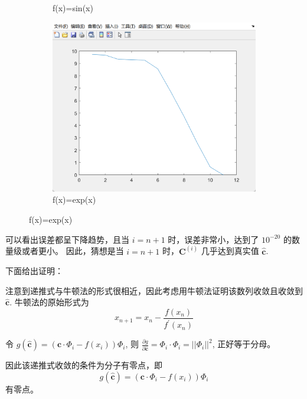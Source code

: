 \documentclass[11pt]{ctexart}
\begin{document}
\begin{figure}[H]
\begin{subfigure}[t]{0.3\textwidth}
            \caption{f(x)=sin(x)}
            \label{fig:b}
        \end{subfigure}
        \begin{subfigure}[t]{0.3\textwidth}
            \centering
            \includegraphics[width=\textwidth]{./picture/exp1_3_3}
            \caption{f(x)=exp(x)}
        \end{subfigure}
    \end{figure}

    可以看出误差都呈下降趋势，且当 \(i=n+1\) 时，误差非常小，达到了 \(10^{-20}\) 的数量级或者更小。
    因此，猜想是当 \(i=n+1\) 时，\(\boldsymbol{C}^{(i)}\) 几乎达到真实值 \(\mathbf{\hat{c}}\).

    下面给出证明：

    注意到递推式与牛顿法的形式很相近，因此考虑用牛顿法证明该数列收敛且收敛到 \(\mathbf{\hat{c}}\).
    牛顿法的原始形式为
    \begin{equation}
        x_{n+1}=x_{n}-\frac{f\left(x_{n}\right)}{f^{\prime}\left(x_{n}\right)}
    \end{equation}

    \hspace{2em}
    令 \(g(\mathbf{\hat{c}})=(\mathbf{c}\cdot \Phi_i- f(x_i))\Phi_i\), 则
    \(\frac{\partial g}{\partial \mathbf{\hat c}} =\Phi_i \cdot \Phi_i=||\Phi_i||^2\), 正好等于分母。

    因此该递推式收敛的条件为分子有零点，即
    \begin{equation}
        g(\mathbf{\hat{c}})=(\mathbf{c}\cdot \Phi_i- f(x_i))\Phi_i \label{eq:eq1}
    \end{equation}
    有零点。
\end{document}
